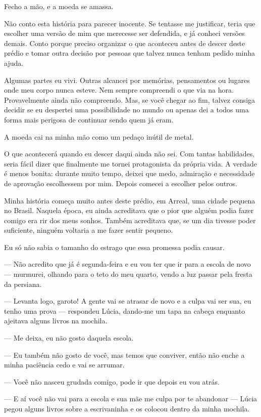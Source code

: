 Fecho a mão, e a moeda se amassa.

Não conto esta história para parecer inocente. Se tentasse me justificar, teria que escolher uma versão de mim que merecesse ser defendida, e já conheci versões demais. Conto porque preciso organizar o que aconteceu antes de descer deste prédio e tomar outra decisão por pessoas que talvez nunca tenham pedido minha ajuda.

Algumas partes eu vivi. Outras alcancei por memórias, pensamentos ou lugares onde meu corpo nunca esteve. Nem sempre compreendi o que via na hora. Provavelmente ainda não compreendo. Mas, se você chegar ao fim, talvez consiga decidir se eu despertei uma possibilidade no mundo ou apenas dei a todos uma forma mais perigosa de continuar sendo quem já eram.

A moeda cai na minha mão como um pedaço inútil de metal.

O que acontecerá quando eu descer daqui ainda não sei. Com tantas habilidades, seria fácil dizer que finalmente me tornei protagonista da própria vida. A verdade é menos bonita: durante muito tempo, deixei que medo, admiração e necessidade de aprovação escolhessem por mim. Depois comecei a escolher pelos outros.

Minha história começa muito antes deste prédio, em Arreal, uma cidade pequena no Brasil. Naquela época, eu ainda acreditava que o pior que alguém podia fazer comigo era rir dos meus sonhos. Também acreditava que, se um dia tivesse poder suficiente, ninguém voltaria a me fazer sentir pequeno.

Eu só não sabia o tamanho do estrago que essa promessa podia causar.

— Não acredito que já é segunda-feira e eu vou ter que ir para a escola de novo — murmurei, olhando para o teto do meu quarto, vendo a luz passar pela fresta da persiana.

— Levanta logo, garoto! A gente vai se atrasar de novo e a culpa vai ser sua, eu tenho uma prova — respondeu Lúcia, dando-me um tapa na cabeça enquanto ajeitava alguns livros na mochila.

— Me deixa, eu não gosto daquela escola.

— Eu também não gosto de você, mas temos que conviver, então não enche a minha paciência cedo e vai se arrumar.

— Você não nasceu grudada comigo, pode ir que depois eu vou atrás.

— E aí você não vai para a escola e sua mãe me culpa por te abandonar — Lúcia pegou alguns livros sobre a escrivaninha e os colocou dentro da minha mochila.

